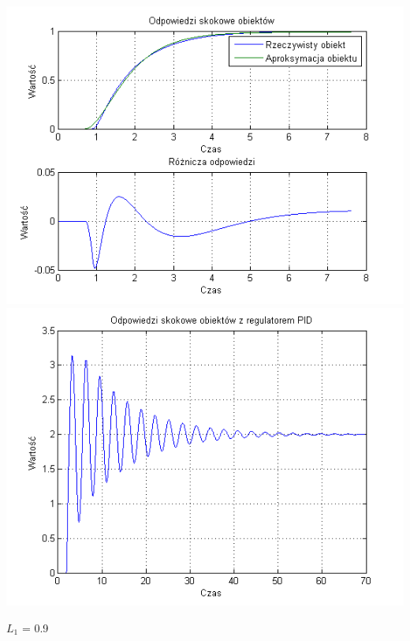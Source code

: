 \documentclass[10pt,a4paper]{article}
\begin{document}
\begin{center}
\includegraphics[scale=1]{images/dwa/skrypt_167.png}\\
\includegraphics[scale=1]{images/dwa/skrypt_168.png}\\
\end{center}
\newpage
$L_1$ = 0.9
\end{document}
